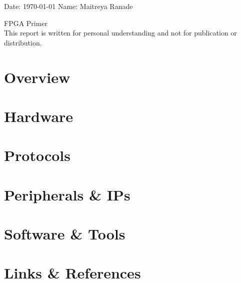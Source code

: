\documentclass{report}
\begin{document}
\onehalfspacing
	Date: \today{} \hfill{} Name: Maitreya Ranade
	\begin{center}
		\vspace*{\fill}
		{\LARGE FPGA Primer} \\
		This report is written for personal understanding and not for publication or distribution.
		\vspace*{\fill}
	\end{center}

\pagebreak
\singlespacing
\tableofcontents{}
\pagebreak

\chapter{Overview}
\pagebreak
	
\chapter{Hardware}
   \pagebreak

\chapter{Protocols}
   \pagebreak

\chapter{Peripherals \& IPs}
   \pagebreak

\chapter{Software \& Tools}
   \pagebreak

\chapter{Links \& References}
   \pagebreak
\end{document}
